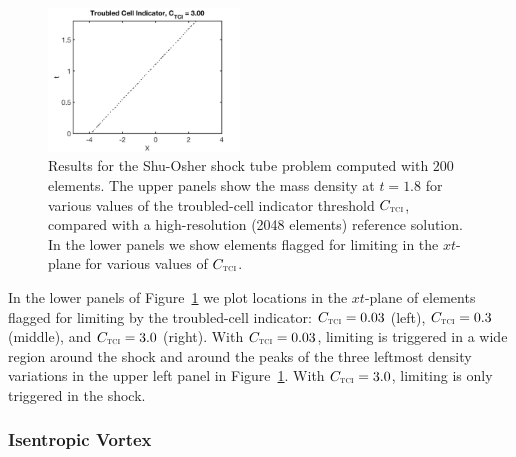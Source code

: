 \documentclass[letterpaper]{jpconf}
\newcommand{\TCI}{\textnormal{\tiny\textsc{TCI}}}
\begin{document}
\begin{figure}[h]
\begin{minipage}{12pc}
    \includegraphics[width=12pc]{./Figures/ShuOsher_TCI_1500_Astronum_2018}
  \end{minipage}
  \caption{\label{fig:ShuOsher}Results for the Shu-Osher shock tube problem computed with $200$ elements.  The upper panels show the mass density at $t=1.8$ for various values of the troubled-cell indicator threshold $C_{\TCI}$, compared with a high-resolution (2048 elements) reference solution.  In the lower panels we show elements flagged for limiting in the $xt$-plane for various values of $C_{\TCI}$.}
\end{figure}
In the lower panels of Figure~\ref{fig:ShuOsher} we plot locations in the $xt$-plane of elements flagged for limiting by the troubled-cell indicator: $C_{\TCI}=0.03$ (left), $C_{\TCI}=0.3$ (middle), and $C_{\TCI}=3.0$ (right).  
With $C_{\TCI}=0.03$, limiting is triggered in a wide region around the shock and around the peaks of the three leftmost density variations in the upper left panel in Figure~\ref{fig:ShuOsher}.  
With $C_{\TCI}=3.0$, limiting is only triggered in the shock.  

\subsubsection{Isentropic Vortex}
\end{document}

